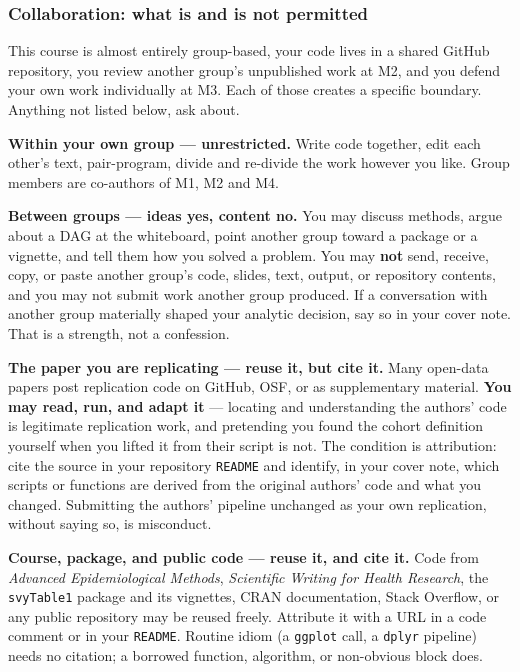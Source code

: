 \documentclass[
]{article}
\begin{document}
\subsubsection{Collaboration: what is and is not
permitted}\label{collaboration-what-is-and-is-not-permitted}

This course is almost entirely group-based, your code lives in a shared
GitHub repository, you review another group's unpublished work at M2,
and you defend your own work individually at M3. Each of those creates a
specific boundary. Anything not listed below, ask about.

\textbf{Within your own group --- unrestricted.} Write code together,
edit each other's text, pair-program, divide and re-divide the work
however you like. Group members are co-authors of M1, M2 and M4.

\textbf{Between groups --- ideas yes, content no.} You may discuss
methods, argue about a DAG at the whiteboard, point another group toward
a package or a vignette, and tell them how you solved a problem. You may
\textbf{not} send, receive, copy, or paste another group's code, slides,
text, output, or repository contents, and you may not submit work
another group produced. If a conversation with another group materially
shaped your analytic decision, say so in your cover note. That is a
strength, not a confession.

\textbf{The paper you are replicating --- reuse it, but cite it.} Many
open-data papers post replication code on GitHub, OSF, or as
supplementary material. \textbf{You may read, run, and adapt it} ---
locating and understanding the authors' code is legitimate replication
work, and pretending you found the cohort definition yourself when you
lifted it from their script is not. The condition is attribution: cite
the source in your repository \texttt{README} and identify, in your
cover note, which scripts or functions are derived from the original
authors' code and what you changed. Submitting the authors' pipeline
unchanged as your own replication, without saying so, is misconduct.

\textbf{Course, package, and public code --- reuse it, and cite it.}
Code from \emph{Advanced Epidemiological Methods}, \emph{Scientific
Writing for Health Research}, the \texttt{svyTable1} package and its
vignettes, CRAN documentation, Stack Overflow, or any public repository
may be reused freely. Attribute it with a URL in a code comment or in
your \texttt{README}. Routine idiom (a \texttt{ggplot} call, a
\texttt{dplyr} pipeline) needs no citation; a borrowed function,
algorithm, or non-obvious block does.
\end{document}

